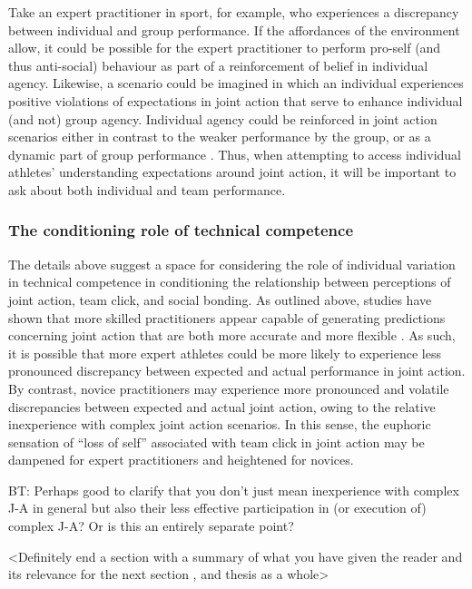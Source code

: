 \begin{CJK}{UTF8}{gbsn}
Take an expert practitioner in sport, for example, who experiences a discrepancy between individual and group performance. If the affordances of the environment allow, it could be possible for the expert practitioner to perform pro-self (and thus anti-social) behaviour as part of a reinforcement of belief in individual agency.  Likewise, a scenario could be imagined in which an individual experiences positive violations of expectations in joint action that serve to enhance individual (and not) group agency.  Individual agency could be reinforced in joint action scenarios either in contrast to the weaker performance by the group, or as a dynamic part of group performance \citep[in a similar sense to the theory of identity fusion, outlined above][]{Swann2009,Swann2015}. Thus, when attempting to access individual athletes' understanding expectations around joint action, it will be important to ask about both individual and team performance.


\subsubsection{The conditioning role of technical competence}
The details above suggest a space for considering the role of individual variation in technical competence in conditioning the relationship between perceptions of joint action, team click, and social bonding.  As outlined above, studies have shown that more skilled practitioners appear capable of generating predictions concerning joint action that are both more accurate and more flexible \citep{Schmidt2011,Tomeo2012,Caron2017}.  As such, it is possible that more expert athletes could be more likely to experience less pronounced discrepancy between expected and actual performance in joint action. By contrast, novice practitioners may experience more pronounced and volatile discrepancies between expected and actual joint action, owing to the relative inexperience with complex joint action scenarios.  In this sense, the euphoric sensation of ``loss of self'' associated with team click in joint action may be dampened for expert practitioners and heightened for novices.

BT: Perhaps good to clarify that you don’t just mean inexperience with complex J-A in general but also their less effective participation in (or execution of) complex J-A? Or is this an entirely separate point?

<Definitely end a section with a summary of what you have given the reader and its relevance for the next section , and thesis as a whole>



\end{CJK}
